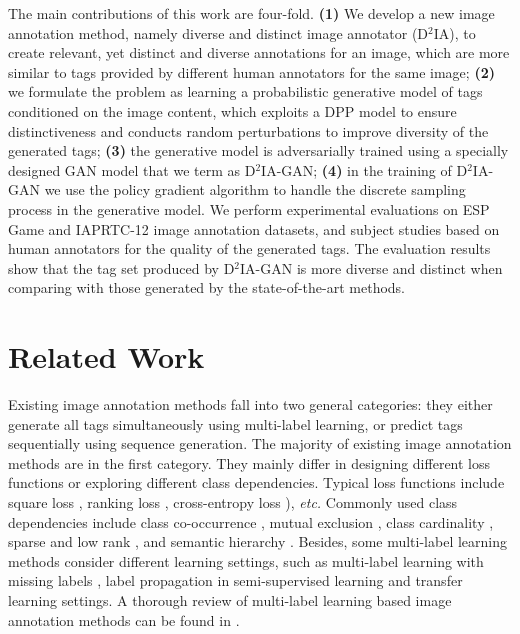 \documentclass[10pt,twocolumn,letterpaper]{article}
\begin{document}
The main contributions of this work are four-fold. 
{\bf (1)} We develop a new image annotation method, namely diverse and distinct image annotator (D$^2$IA), to create relevant, yet distinct and diverse annotations for an image, which are more similar to tags provided by different human annotators for the same image;
{\bf (2)} we formulate the problem as learning a probabilistic generative model of tags conditioned on the image content, which exploits a DPP model to ensure distinctiveness and conducts random perturbations to improve diversity of the generated tags; 
{\bf (3)} the generative model is adversarially trained using a specially designed GAN model that we term as D$^2$IA-GAN;
{\bf (4)} in the training of D$^2$IA-GAN we use the policy gradient algorithm to handle the discrete sampling process in the generative model. 
We perform experimental evaluations on ESP Game \cite{espgame-2004} and IAPRTC-12 \cite{iaprtc-12-data-2006} image annotation datasets, and subject studies based on human annotators for the quality of the generated tags. The evaluation results show that the tag set produced by D$^2$IA-GAN is more diverse and distinct when comparing with those generated by the state-of-the-art methods.

\section{Related Work}
\label{sec: related work}

Existing image annotation methods fall into two general categories: they either generate all tags simultaneously using multi-label learning, or predict tags sequentially using sequence generation.
The majority of existing image annotation methods are in the first category.
They mainly differ in designing different loss functions or exploring different class dependencies. 
Typical loss functions include square loss \cite{LEML-ICML-2014, muitilabel-attention-cvpr-2017},  
ranking loss \cite{cnn-image-annotation-arxiv-2013, pairwise-ranking-jiebo-cvpr-2017}, cross-entropy loss \cite{spatial-regularization-cvpr-2017}), {\it etc.} 
Commonly used class dependencies include class co-occurrence \cite{my-icpr-2014,my-pr-2015,li2016facial}, mutual exclusion \cite{xiaotong-multi-label-exclusive-2011, deep-dpp-cvpr-2017}, class cardinality \cite{my-aaai-2016-imbalance}, sparse and low rank \cite{my-ijcv-2018}, and semantic hierarchy \cite{my-iccv-2015}. 
Besides, some multi-label learning methods consider different learning settings, such as multi-label learning with missing labels \cite{my-icpr-2014, my-pr-2015}, label propagation in semi-supervised learning \cite{ssl-wei-liu-icml-2010, teach-to-learn-wei-liu-aaai-2016, teach-to-learn-wei-liu-tnnls-2017} and transfer learning \cite{multi-label-transfer-wei-liu-pami-2017} settings. 
A thorough review of multi-label learning based image annotation methods can be found in      
 \cite{review-image-annotation-pr-2012}.
\end{document}
